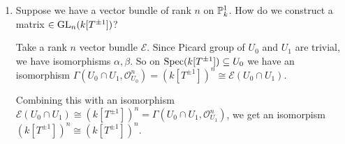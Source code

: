 \newcommand{\sheet}{9}




\maketitle{}

\begin{exercise}{2}
    \begin{enumerate}
        \item{
            Suppose we have a vector bundle of rank $n$ on $\mathbb{P}^1_k$. How do
            we construct a matrix $\in \operatorname{GL}_n(k[T^{\pm 1}])$?

            Take a rank $n$ vector bundle $\mathcal{E}$. Since Picard group of
            $U_0$ and $U_1$ are trivial, we have isomorphisms $\alpha, \beta$.
            So on $\operatorname{Spec}(k[T^{\pm 1}]) \subseteq U_0$ we have an isomorphism
            $\Gamma(U_0 \cap U_1, \mathcal{O}^n_{U_0}) = (k[T^{\pm 1}])^n \cong
            \mathcal{E}(U_0 \cap U_1)$.

            Combining this with an isomorphism $\mathcal{E}(U_0 \cap U_1) \cong
            (k[T^{\pm 1}])^n = \Gamma(U_0 \cap U_1, \mathcal{O}^n_{U_1})$, we
            get an isomorpism $(k[T^{\pm 1}])^n \cong (k[T^{\pm 1}])^n$.

}
\end{enumerate}
\end{exercise}
